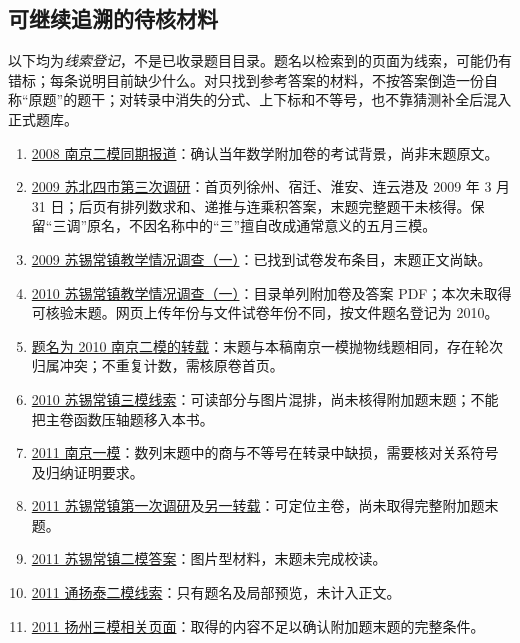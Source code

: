 \documentclass[UTF8,12pt,a4paper,fontset=fandol]{ctexart}
\begin{document}
\subsection{可继续追溯的待核材料}
以下均为\emph{线索登记}，不是已收录题目目录。题名以检索到的页面为线索，可能仍有错标；每条说明目前缺少什么。对只找到参考答案的材料，不按答案倒造一份自称“原题”的题干；对转录中消失的分式、上下标和不等号，也不靠猜测补全后混入正式题库。
\begin{enumerate}
\item \href{https://edu.sina.com.cn/gaokao/2008-04-28/1038136658.shtml}{2008 南京二模同期报道}：确认当年数学附加卷的考试背景，尚非末题原文。
\item \href{https://doc.xuehai.net/b8dc14801260df2bee36b2ffd.html}{2009 苏北四市第三次调研}：首页列徐州、宿迁、淮安、连云港及 2009 年 3 月 31 日；后页有排列数求和、递推与连乘积答案，末题完整题干未核得。保留“三调”原名，不因名称中的“三”擅自改成通常意义的五月三模。
\item \href{https://m.liuxue86.com/a/485326.html}{2009 苏锡常镇教学情况调查（一）}：已找到试卷发布条目，末题正文尚缺。
\item \href{https://www.tthaoke.com/shijuan_37108.html}{2010 苏锡常镇教学情况调查（一）}：目录单列附加卷及答案 PDF；本次未取得可核验末题。网页上传年份与文件试卷年份不同，按文件题名登记为 2010。
\item \href{https://doc.xuehai.net/ba99b4701970c23149844d317.html}{题名为 2010 南京二模的转载}：末题与本稿南京一模抛物线题相同，存在轮次归属冲突；不重复计数，需核原卷首页。
\item \href{https://doc.xuehai.net/bdb0bd5ffdb8e57341a9c50cf.html}{2010 苏锡常镇三模线索}：可读部分与图片混排，尚未核得附加题末题；不能把主卷函数压轴题移入本书。
\item \href{https://doc.xuehai.net/bd5dae6b568cf4072bb664ad4.html}{2011 南京一模}：数列末题中的商与不等号在转录中缺损，需要核对关系符号及归纳证明要求。
\item \href{https://wenku.baidu.com/view/47100f08581b6bd97f19eaf9.html}{2011 苏锡常镇第一次调研}及\href{https://max.book118.com/html/2016/1021/60264575.shtm}{另一转载}：可定位主卷，尚未取得完整附加题末题。
\item \href{https://doc.xuehai.net/b5e02fd9333058500970cd509.html}{2011 苏锡常镇二模答案}：图片型材料，末题未完成校读。
\item \href{https://max.book118.com/html/2017/0331/98187113.shtm}{2011 通扬泰二模线索}：只有题名及局部预览，未计入正文。
\item \href{https://www.renrendoc.com/paper/112511852.html}{2011 扬州三模相关页面}：取得的内容不足以确认附加题末题的完整条件。

\end{enumerate}
\end{document}

